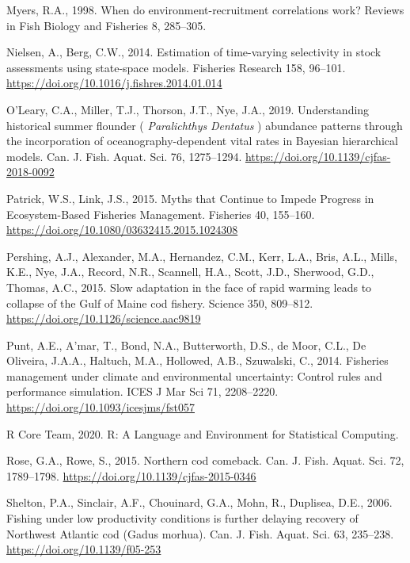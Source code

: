 \documentclass[]{article}
\begin{document}
\leavevmode\hypertarget{ref-myers1998When}{}%
Myers, R.A., 1998. When do environment-recruitment correlations work?
Reviews in Fish Biology and Fisheries 8, 285--305.

\leavevmode\hypertarget{ref-nielsen2014Estimation}{}%
Nielsen, A., Berg, C.W., 2014. Estimation of time-varying selectivity in
stock assessments using state-space models. Fisheries Research 158,
96--101. \url{https://doi.org/10.1016/j.fishres.2014.01.014}

\leavevmode\hypertarget{ref-oleary2019Understanding}{}%
O'Leary, C.A., Miller, T.J., Thorson, J.T., Nye, J.A., 2019.
Understanding historical summer flounder ( \emph{Paralichthys}
\emph{Dentatus} ) abundance patterns through the incorporation of
oceanography-dependent vital rates in Bayesian hierarchical models. Can.
J. Fish. Aquat. Sci. 76, 1275--1294.
\url{https://doi.org/10.1139/cjfas-2018-0092}

\leavevmode\hypertarget{ref-patrick2015Myths}{}%
Patrick, W.S., Link, J.S., 2015. Myths that Continue to Impede Progress
in Ecosystem-Based Fisheries Management. Fisheries 40, 155--160.
\url{https://doi.org/10.1080/03632415.2015.1024308}

\leavevmode\hypertarget{ref-pershing2015Slow}{}%
Pershing, A.J., Alexander, M.A., Hernandez, C.M., Kerr, L.A., Bris,
A.L., Mills, K.E., Nye, J.A., Record, N.R., Scannell, H.A., Scott, J.D.,
Sherwood, G.D., Thomas, A.C., 2015. Slow adaptation in the face of rapid
warming leads to collapse of the Gulf of Maine cod fishery. Science 350,
809--812. \url{https://doi.org/10.1126/science.aac9819}

\leavevmode\hypertarget{ref-punt2014Fisheries}{}%
Punt, A.E., A'mar, T., Bond, N.A., Butterworth, D.S., de Moor, C.L., De
Oliveira, J.A.A., Haltuch, M.A., Hollowed, A.B., Szuwalski, C., 2014.
Fisheries management under climate and environmental uncertainty:
Control rules and performance simulation. ICES J Mar Sci 71, 2208--2220.
\url{https://doi.org/10.1093/icesjms/fst057}

\leavevmode\hypertarget{ref-rcoreteam2020Language}{}%
R Core Team, 2020. R: A Language and Environment for Statistical
Computing.

\leavevmode\hypertarget{ref-rose2015Northern}{}%
Rose, G.A., Rowe, S., 2015. Northern cod comeback. Can. J. Fish. Aquat.
Sci. 72, 1789--1798. \url{https://doi.org/10.1139/cjfas-2015-0346}

\leavevmode\hypertarget{ref-shelton2006Fishing}{}%
Shelton, P.A., Sinclair, A.F., Chouinard, G.A., Mohn, R., Duplisea,
D.E., 2006. Fishing under low productivity conditions is further
delaying recovery of Northwest Atlantic cod (Gadus morhua). Can. J.
Fish. Aquat. Sci. 63, 235--238. \url{https://doi.org/10.1139/f05-253}
\end{document}
